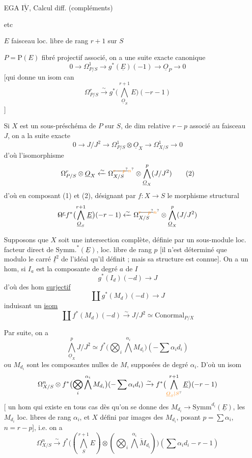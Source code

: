 EGA $\overline{\underline{\mathrm{IV}}}$, Calcul diff. (compléments)

 etc

$E$ faisceau loc. libre de rang $r+1$ sur $S$

$P=\mathrm{P}(E)$ fibré projectif associé, on a une suite exacte canonique
\[
0\longrightarrow\Omega^1_{P/S}\longrightarrow g^*(\underline E)(-1)\longrightarrow\underline O_P\longrightarrow0
\]
[qui donne un isom can
\[
\Omega^r_{P/S}\xrightarrow{\sim}g^*\bigl(\bigwedge_{\underline O_S}^{r+1}E\bigr)(-r-1)\tag*{(1)}
\]
\hfill$]$

Si  $X$ est un sous-préschéma de $P$  sur $S$, de dim relative $r-p$
associé au faisceau  $J$, on a la suite exacte
\[
0\longrightarrow J/J^2\longrightarrow\Omega^1_{P/S}\otimes\underline O_X\longrightarrow\Omega^1_{X/S}\longrightarrow0
\]
d'où l'isomorphisme
\[
\Omega^r_{P/S}\otimes\underline O_X\xleftarrow{\sim}\Omega^{\deleted{\unsure{r-p}}\unsure{n}}_{X/S}\otimes\bigwedge^p_{\underline O_X}(J/J^2)\tag*{(2)}
\]
d'où en composant (1) et (2), désignant par $f:X\to S$
le morphisme structural
\[
\deleted{\Omega^r}f^*\bigl(\bigwedge_{\underline O_S}^{r+1}\underline E\bigr)(-r-1)\xleftarrow{\sim}\Omega^{\deleted{\unsure{r-p}}\unsure{n}}_{X/S}\otimes\bigwedge^p_{\underline O_X}(J/J^2)
\]

Supposons que $X$ soit une intersection complète, définie
par un sous-module  loc. facteur direct de $\mathrm{Symm.}^{*}(\underline E)$,
 loc. libre de rang $p$ [il n'est 
déterminé que modulo le carré $\underline I^2$ de l'idéal qu'il
définit ; mais sa structure est connue]. On a
un hom, si $I_a$ est la composante de degré $a$ de $I$
\[
g^*(I_d)(-d)\longrightarrow J
\]
d'où des hom \uline{surjectif}
\[
\coprod g^*(M_d)(-d)\longrightarrow J
\]
induisant un \uline{isom}
\[
\coprod f^*(M_d)(-d)\xrightarrow{\sim}J/J^2\simeq\mathrm{Conormal}_{P/X}
\]

Par suite, on a
\[
\bigwedge_{\underline O_X}^p J/J^2\simeq f^*\bigl(\bigotimes_i\bigwedge^{\alpha_i} M_{d_i}\bigr)(-\sum\alpha_i d_i)
\]
ou $M_{d_i}$ sont les composantes  nulles de $M$, supposées
de degré $\alpha_i$. D'où un isom
\[
\Omega^n_{X/S}\otimes f^*\bigl(\bigotimes_i\bigwedge^{\alpha_i}M_{d_i}\bigr)(-\sum\alpha_i d_i)
\xrightarrow{\sim}f^*\bigl(\bigwedge_{\unsure{\underline O_S|S}}^{r+1}\underline E\bigr)(-r-1)
\]
[ un hom qui existe en tous cas dès
qu'on se donne des $M_{d_i}\longrightarrow\mathrm{Symm}^{d_i}(\underline E)$, les $M_{d_i}$ loc.
libres de rang $\alpha_i$, et $X$ défini par  images
des $M_{d_i}$, posant $p=\sum\alpha_i$, $n=r-p$], i.e. on a
\[
\Omega^n_{X/S}\xrightarrow{\sim}f^*\bigl((\bigwedge_S^{r+1}E)\otimes(\bigotimes_i\bigwedge^{\alpha_i}\check M_{d_i})\bigr)(\sum\alpha_i d_i-r-1)
\]

